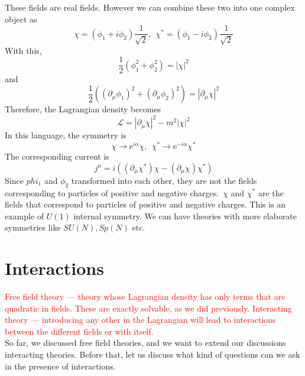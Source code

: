 \documentclass[11pt, notitlepage]{report}
\newcommand{\del}{\partial}
\newcommand{\e}{\mathrm{e}}
\newcommand{\ld}{\mathcal{L}}
\numberwithin{equation}{section}
\begin{document}
    These fields are real fields. However we can combine these two into one complex object as
    \begin{equation*}
        \chi = (\phi_1 + i\phi_2)\frac{1}{\sqrt{2}},~~\chi^* = (\phi_1 - i\phi_2)\frac{1}{\sqrt{2}}
    \end{equation*}
    With this, 
    \begin{equation*}
        \frac{1}{2}(\phi_1^2 + \phi_2^2) = |\chi|^2
    \end{equation*}
    and 
    \begin{equation*}
        \frac{1}{2} ((\del_\mu \phi_1)^2 + (\del_\mu \phi_2)^2) = |\del_\mu \chi|^2
    \end{equation*}
    Therefore, the Lagrangian density becomes
    \begin{equation*}
        \ld = |\del_\mu \chi|^2 - m^2 |\chi|^2
    \end{equation*}
    In this language, the symmetry is
    \begin{equation*}
        \chi \to \e^{i\alpha} \chi,~~\chi^* \to \e^{-i\alpha}\chi^*
    \end{equation*}
    The corresponding current is 
    \begin{equation*}
        j^\mu = i((\del_\mu \chi^*) \chi - (\del_\mu\chi)\chi^*)
    \end{equation*}
    Since \(phi_1\) and \(\phi_2\) transformed into each other, they are not the fields corresponding to particles of positive and negative charges.\ \(\chi\) and \(\chi^*\) are the fields that correspond to particles of positive and negative charges. This is an example of \(U(1)\) internal symmetry. We can have theories with more elaborate symmetries like \(SU(N), Sp(N)\) etc.

    \newpage 
    \section{Interactions}

    \textcolor{red}{Free field theory — theory whose Lagrangian density has only terms that are quadratic in fields. These are exactly solvable, as we did previously. Interacting theory — introducing any other in the Lagrangian will lead to interactions between the different fields or with itself.}\\

    So far, we discussed free field theories, and we want to extend our discussions interacting theories. Before that, let us discuss what kind of questions can we ask in the presence of interactions. 
\end{document}

